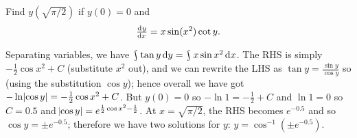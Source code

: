 \documentclass[answers]{exam}
\theoremstyle{definition}
\theoremstyle{break}
\DeclareMathOperator*{\rint}{\scalerel*{\rotatebox{17}{$\!\int\!$}}{\int}}
\begin{document}
\begin{questions}
  \question[5] Find $ y(\sqrt{\pi/2}) $ if $ y(0) = 0 $ and
    \begin{displaymath}
      \od{y}{x} = x\sin(x^2) \cot y.
    \end{displaymath}
  \begin{solution}
    Separating variables, we have $ \rint \tan y \dif{y} = \rint x\sin x^2 \dif{x} $. The RHS is simply $ -\frac{1}{2} \cos x^2 + C$ (substitute $ x^2 $ out),
    and we can rewrite the LHS as $ \tan y = \frac{\sin y}{\cos y} $ so (using the substitution $ \cos y $); hence overall we have got
    $ -\ln \abs{\cos y} = -\frac{1}{2} \cos x^2 + C $. But $ y(0) = 0 $ so $ -\ln 1 = -\frac{1}{2} + C $ and $ \ln{1} = 0 $ so $ C = 0.5 $
    and $ \abs{\cos y} = e^{\frac{1}{2} \cos x^2 - \frac{1}{2}} $. At $ x = \sqrt{\pi/2} $, the RHS becomes $ e^{-0.5} $ and so $ \cos y = \pm e^{-0.5} $;
    therefore we have two solutions for $ y $: $ y = \cos^{-1} (\pm e^{-0.5}) $.
  \end{solution}
\end{questions}
\end{document}
